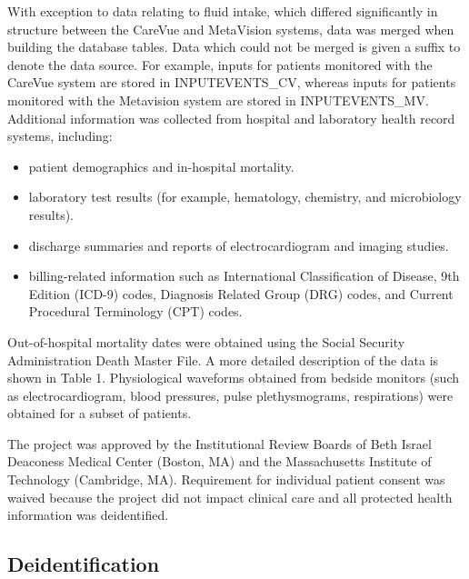 \documentclass[english]{article}
\begin{document}
With exception to data relating to fluid intake, which differed significantly in structure between the CareVue and MetaVision systems, data was merged when building the database tables. Data which could not be merged is given a suffix to denote the data source. For example, inputs for patients monitored with the CareVue system are stored in INPUTEVENTS\_CV, whereas inputs for patients monitored with the Metavision system are stored in INPUTEVENTS\_MV. Additional information was collected from hospital and laboratory health record systems, including:
\begin{itemize}
  \item patient demographics and in-hospital mortality.
  \item laboratory test results (for example, hematology, chemistry, and microbiology results).
  \item discharge summaries and reports of electrocardiogram and imaging studies.
  \item billing-related information such as International Classification of Disease, 9th Edition (ICD-9) codes, Diagnosis Related Group (DRG) codes, and Current Procedural Terminology (CPT) codes.
\end{itemize}
Out-of-hospital mortality dates were obtained using the Social Security Administration Death Master File. A more detailed description of the data is shown in Table 1. Physiological waveforms obtained from bedside monitors (such as electrocardiogram, blood pressures, pulse plethysmograms, respirations) were obtained for a subset of patients. 

The project was approved by the Institutional Review Boards of Beth Israel Deaconess Medical Center (Boston, MA) and the Massachusetts Institute of Technology (Cambridge, MA). Requirement for individual patient consent was waived because the project did not impact clinical care and all protected health information was deidentified.

\subsection*{Deidentification}
\end{document}
